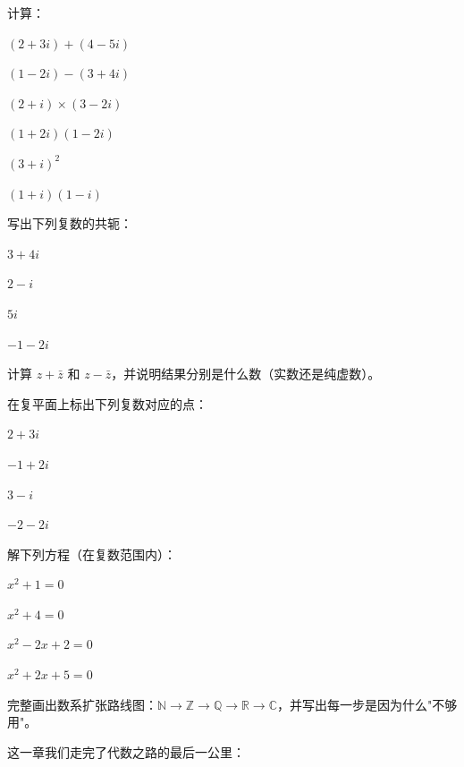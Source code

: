 \begin{exercise}
\item 计算：
  \begin{subexercise}
    \item $(2+3i)+(4-5i)$
    \item $(1-2i)-(3+4i)$
    \item $(2+i)\times(3-2i)$
    \item $(1+2i)(1-2i)$
    \item $(3+i)^2$
    \item $(1+i)(1-i)$
  \end{subexercise}

\item 写出下列复数的共轭：
  \begin{subexercise}
    \item $3+4i$
    \item $2-i$
    \item $5i$
    \item $-1-2i$
  \end{subexercise}

\item 计算 $z+\bar{z}$ 和 $z-\bar{z}$，并说明结果分别是什么数（实数还是纯虚数）。

\item 在复平面上标出下列复数对应的点：
  \begin{subexercise}
    \item $2+3i$
    \item $-1+2i$
    \item $3-i$
    \item $-2-2i$
  \end{subexercise}

\item 解下列方程（在复数范围内）：
  \begin{subexercise}
    \item $x^2+1=0$
    \item $x^2+4=0$
    \item $x^2-2x+2=0$
    \item $x^2+2x+5=0$
  \end{subexercise}

\item 完整画出数系扩张路线图：$\mathbb{N} \to \mathbb{Z} \to \mathbb{Q} \to \mathbb{R} \to \mathbb{C}$，并写出每一步是因为什么"不够用"。
\end{exercise}


这一章我们走完了代数之路的最后一公里：

